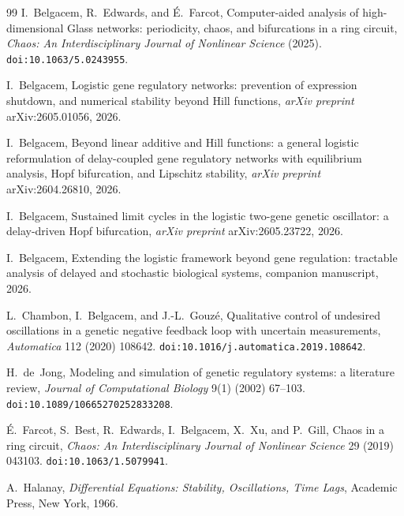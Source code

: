 \documentclass[12pt]{article}
\begin{document}
\begin{thebibliography}{99}
I.~Belgacem, R.~Edwards, and \'E.~Farcot,
\newblock Computer-aided analysis of high-dimensional {G}lass networks:
  periodicity, chaos, and bifurcations in a ring circuit,
\newblock \emph{Chaos: An Interdisciplinary Journal of Nonlinear Science} (2025).
\newblock \texttt{doi:10.1063/5.0243955}.

I.~Belgacem,
\newblock Logistic gene regulatory networks: prevention of expression shutdown,
  and numerical stability beyond {H}ill functions,
\newblock \emph{arXiv preprint} arXiv:2605.01056, 2026.

I.~Belgacem,
\newblock Beyond linear additive and {H}ill functions: a general logistic
  reformulation of delay-coupled gene regulatory networks with equilibrium
  analysis, {H}opf bifurcation, and {L}ipschitz stability,
\newblock \emph{arXiv preprint} arXiv:2604.26810, 2026.

I.~Belgacem,
\newblock Sustained limit cycles in the logistic two-gene genetic oscillator:
  a delay-driven {H}opf bifurcation,
\newblock \emph{arXiv preprint} arXiv:2605.23722, 2026.

I.~Belgacem,
\newblock Extending the logistic framework beyond gene regulation: tractable
  analysis of delayed and stochastic biological systems,
\newblock companion manuscript, 2026.

L.~Chambon, I.~Belgacem, and J.-L.~Gouz\'e,
\newblock Qualitative control of undesired oscillations in a genetic negative
  feedback loop with uncertain measurements,
\newblock \emph{Automatica} 112 (2020) 108642.
\newblock \texttt{doi:10.1016/j.automatica.2019.108642}.

H.~de~Jong,
\newblock Modeling and simulation of genetic regulatory systems: a literature
  review,
\newblock \emph{Journal of Computational Biology} 9(1) (2002) 67--103.
\newblock \texttt{doi:10.1089/10665270252833208}.

\'E.~Farcot, S.~Best, R.~Edwards, I.~Belgacem, X.~Xu, and P.~Gill,
\newblock Chaos in a ring circuit,
\newblock \emph{Chaos: An Interdisciplinary Journal of Nonlinear Science} 29
  (2019) 043103.
\newblock \texttt{doi:10.1063/1.5079941}.

A.~Halanay,
\newblock \emph{Differential Equations: Stability, Oscillations, Time Lags},
\newblock Academic Press, New York, 1966.


\end{thebibliography}
\end{document}
